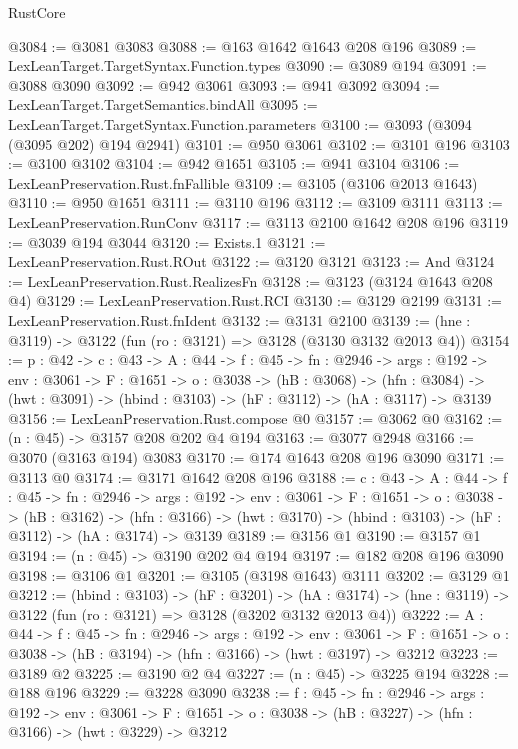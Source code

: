 \begin{lexlean}{RustCore}
\begin{coremodule}
@3084 := @3081 @3083
@3088 := @163 @1642 @1643 @208 @196
@3089 := LexLeanTarget.TargetSyntax.Function.types
@3090 := @3089 @194
@3091 := @3088 @3090
@3092 := @942 @3061
@3093 := @941 @3092
@3094 := LexLeanTarget.TargetSemantics.bindAll
@3095 := LexLeanTarget.TargetSyntax.Function.parameters
@3100 := @3093 (@3094 (@3095 @202) @194 @2941)
@3101 := @950 @3061
@3102 := @3101 @196
@3103 := @3100 @3102
@3104 := @942 @1651
@3105 := @941 @3104
@3106 := LexLeanPreservation.Rust.fnFallible
@3109 := @3105 (@3106 @2013 @1643)
@3110 := @950 @1651
@3111 := @3110 @196
@3112 := @3109 @3111
@3113 := LexLeanPreservation.RunConv
@3117 := @3113 @2100 @1642 @208 @196
@3119 := @3039 @194 @3044
@3120 := Exists.{1}
@3121 := LexLeanPreservation.Rust.ROut
@3122 := @3120 @3121
@3123 := And
@3124 := LexLeanPreservation.Rust.RealizesFn
@3128 := @3123 (@3124 @1643 @208 @4)
@3129 := LexLeanPreservation.Rust.RCI
@3130 := @3129 @2199
@3131 := LexLeanPreservation.Rust.fnIdent
@3132 := @3131 @2100
@3139 := (hne : @3119) -> @3122 (fun (ro : @3121) => @3128 (@3130 @3132 @2013 @4))
@3154 := {p : @42} ->
  {c : @43} ->
  {A : @44} ->
  {f : @45} ->
  {fn : @2946} ->
  {args : @192} ->
  {env : @3061} ->
  {F : @1651} ->
  {o : @3038} ->
  (hB : @3068) ->
  (hfn : @3084) -> (hwt : @3091) -> (hbind : @3103) -> (hF : @3112) -> (hA : @3117) -> @3139
@3156 := LexLeanPreservation.Rust.compose @0
@3157 := @3062 @0
@3162 := (n : @45) -> @3157 @208 @202 @4 @194
@3163 := @3077 @2948
@3166 := @3070 (@3163 @194) @3083
@3170 := @174 @1643 @208 @196 @3090
@3171 := @3113 @0
@3174 := @3171 @1642 @208 @196
@3188 := {c : @43} ->
  {A : @44} ->
  {f : @45} ->
  {fn : @2946} ->
  {args : @192} ->
  {env : @3061} ->
  {F : @1651} ->
  {o : @3038} ->
  (hB : @3162) ->
  (hfn : @3166) -> (hwt : @3170) -> (hbind : @3103) -> (hF : @3112) -> (hA : @3174) -> @3139
@3189 := @3156 @1
@3190 := @3157 @1
@3194 := (n : @45) -> @3190 @202 @4 @194
@3197 := @182 @208 @196 @3090
@3198 := @3106 @1
@3201 := @3105 (@3198 @1643) @3111
@3202 := @3129 @1
@3212 := (hbind : @3103) ->
  (hF : @3201) ->
  (hA : @3174) -> (hne : @3119) -> @3122 (fun (ro : @3121) => @3128 (@3202 @3132 @2013 @4))
@3222 := {A : @44} ->
  {f : @45} ->
  {fn : @2946} ->
  {args : @192} ->
  {env : @3061} ->
  {F : @1651} -> {o : @3038} -> (hB : @3194) -> (hfn : @3166) -> (hwt : @3197) -> @3212
@3223 := @3189 @2
@3225 := @3190 @2 @4
@3227 := (n : @45) -> @3225 @194
@3228 := @188 @196
@3229 := @3228 @3090
@3238 := {f : @45} ->
  {fn : @2946} ->
  {args : @192} ->
  {env : @3061} ->
  {F : @1651} -> {o : @3038} -> (hB : @3227) -> (hfn : @3166) -> (hwt : @3229) -> @3212

\end{coremodule}
\end{lexlean}

